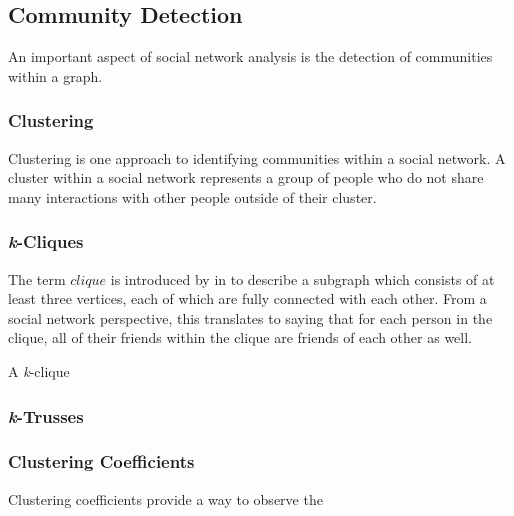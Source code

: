 \subsection{Community Detection}
An important aspect of social network analysis is the detection of communities within a graph.

\subsubsection{Clustering}
Clustering is one approach to identifying communities within a social network. A cluster within a social network represents a group of people who do not share many interactions with other people outside of their cluster.

\subsubsection{\emph{k}-Cliques}
The term $clique$ is introduced by \citeauthor{luce49} in \cite{luce49} to describe a subgraph which consists of at least three vertices, each of which are fully connected with each other. From a social network perspective, this translates to saying that for each person in the clique, all of their friends  within the clique are friends of each other as well.

A \emph{k}-clique

\subsubsection{\emph{k}-Trusses}

\subsubsection{Clustering Coefficients}
Clustering coefficients provide a way to observe the 
